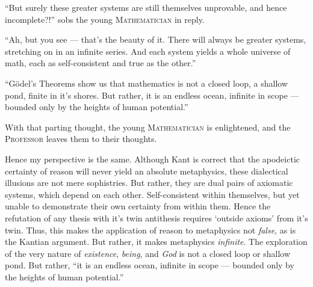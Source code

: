 \begin{displayquote}
  \enquote{But surely these greater systems are still themselves unprovable, and hence incomplete?!} sobs the young \textsc{Mathematician} in reply.

  \enquote{Ah, but you see --- that's the beauty of it. There will always be greater systems, stretching on in an infinite series. And each system yields a whole universe of math, each as self-consistent and true as the other.}

  \enquote{Gödel's Theorems show us that mathematics is not a closed loop, a shallow pond, finite in it's shores. But rather, it is an endless ocean, infinite in scope --- bounded only by the heights of human potential.}

  With that parting thought, the young \textsc{Mathematician} is enlightened, and the \textsc{Professor} leaves them to their thoughts.
\end{displayquote}

\noindent
Hence my perspective is the same. Although Kant is correct that the apodeictic certainty of reason will never yield an absolute metaphysics, these dialectical illusions are not mere sophistries. But rather, they are dual pairs of axiomatic systems, which depend on each other. Self-consistent within themselves, but yet unable to demonstrate their own certainty from within them. Hence the refutation of any thesis with it's twin antithesis requires \enquote*{outside axioms} from it's twin. Thus, this makes the application of reason to metaphysics not \emph{false}, as is the Kantian argument. But rather, it makes metaphysics \emph{infinite}. The exploration of the very nature of \emph{existence}, \emph{being}, and \emph{God} is not a closed loop or shallow pond. But rather, \enquote{it is an endless ocean, infinite in scope --- bounded only by the heights of human potential.}

